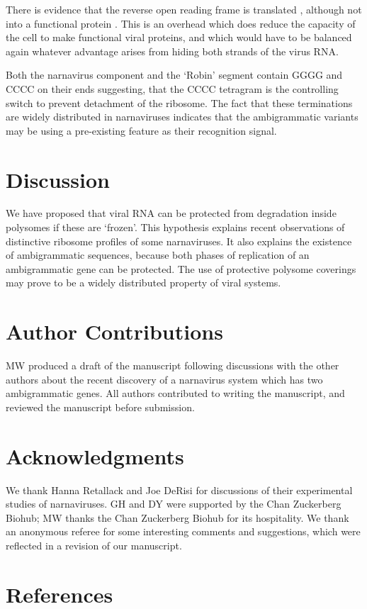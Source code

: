 \documentclass[12pt]{iopart}
\begin{document}
There is evidence that the reverse open reading frame is translated \cite{Ret+20}, although not into a 
functional protein \cite{Dudas2021}.
This is an overhead which does reduce the capacity of the cell to make functional viral proteins, and 
which would have to be balanced again whatever advantage arises from hiding both strands of the virus RNA.

Both the narnavirus component and the \lq Robin' segment contain GGGG and CCCC on their ends
suggesting, that the CCCC tetragram is the controlling switch to prevent detachment 
of the ribosome. The fact that these terminations are widely distributed in narnaviruses indicates that 
the ambigrammatic variants may be using a pre-existing feature as their 
recognition signal. 


\section{Discussion}
\label{sec: 4}

We have proposed that viral RNA can be protected from degradation inside polysomes if these are \lq frozen'. 
This hypothesis explains recent observations \cite{Ret+20} of distinctive ribosome profiles of some narnaviruses. 
It also explains the existence of ambigrammatic sequences, because both phases of replication of 
an ambigrammatic gene can be protected. The use of protective polysome coverings may prove to be 
a widely distributed property of viral systems.
  


\section*{Author Contributions}
MW produced a draft of the manuscript following discussions with the other 
authors about the recent discovery of a narnavirus system which has two 
ambigrammatic genes. All authors contributed to writing the manuscript, and 
reviewed the manuscript before submission. 


\section*{Acknowledgments}

We thank Hanna Retallack and Joe DeRisi for discussions of their
experimental studies of narnaviruses.  GH and DY were supported by the Chan
Zuckerberg Biohub; MW thanks the Chan Zuckerberg Biohub for its hospitality. 
We thank an anonymous referee for some interesting comments and suggestions, 
which were reflected in a revision of our manuscript.

\section*{References}




\end{document}
